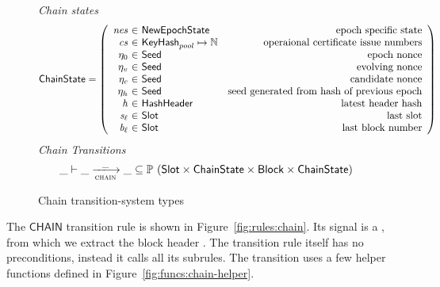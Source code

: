 \begin{figure}
  \emph{Chain states}
  \begin{equation*}
    \ChainState =
    \left(
      \begin{array}{r@{~\in~}lr}
        \var{nes} & \NewEpochState & \text{epoch specific state} \\
        \var{cs} & \KeyHash_{pool} \mapsto \N & \text{operaional certificate issue numbers} \\
        ~\eta_0 & \Seed & \text{epoch nonce} \\
        ~\eta_v & \Seed & \text{evolving nonce} \\
        ~\eta_c & \Seed & \text{candidate nonce} \\
        ~\eta_h & \Seed & \text{seed generated from hash of previous epoch} \\
        \var{h} & \HashHeader & \text{latest header hash} \\
        \var{s_\ell} & \Slot & \text{last slot} \\
        \var{b_\ell} & \Slot & \text{last block number} \\
      \end{array}
    \right)
  \end{equation*}
  \emph{Chain Transitions}
  \begin{equation*}
    \_ \vdash \var{\_} \trans{chain}{\_} \var{\_} \subseteq
    \powerset (\Slot \times \ChainState \times \Block \times \ChainState)
  \end{equation*}
  \caption{Chain transition-system types}
  \label{fig:ts-types:chain}
\end{figure}

The $\mathsf{CHAIN}$ transition rule is shown in
Figure~\ref{fig:rules:chain}. Its signal is a , from which
we extract the block header .
The transition rule itself has no preconditions, instead it calls all its subrules.
The transition uses a few helper functions defined in Figure~\ref{fig:funcs:chain-helper}.

